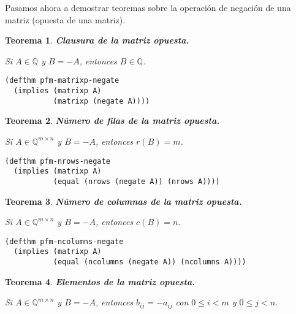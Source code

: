\documentclass[a4paper,10pt]{article}
\newcommand{\Q}[1]{#1 \in \mathbb{Q}}
\newcommand{\M}[3]{#1 \in \mathbb{Q}^{#2 \times #3}}
\newtheorem{teor}{{Teorema}}
\begin{document}
Pasamos ahora a demostrar teoremas sobre la operación de negación de una matriz (opuesta de una matriz).

\par \vspace{16pt}

\begin{teor} \textbf{Clausura de la matriz opuesta.}\vspace{8pt}\par
Si $\Q{A}$ y $B=-A$, entonces $\Q{B}$.
\end{teor}

\begin{lstlisting}[language=clips]
(defthm pfm-matrixp-negate
  (implies (matrixp A)
           (matrixp (negate A))))
\end{lstlisting}

\par \vspace{16pt}

\begin{teor} \textbf{Número de filas de la matriz opuesta.}\vspace{8pt}\par
Si $\M{A}{m}{n}$ y $B=-A$, entonces $r(B) = m$.
\end{teor}

\begin{lstlisting}[language=clips]
(defthm pfm-nrows-negate
  (implies (matrixp A)
           (equal (nrows (negate A)) (nrows A))))
\end{lstlisting}

\par \vspace{16pt}

\begin{teor} \textbf{Número de columnas de la matriz opuesta.}\vspace{8pt}\par
Si $\M{A}{m}{n}$ y $B=-A$, entonces $c(B) = n$.
\end{teor}

\begin{lstlisting}[language=clips]
(defthm pfm-ncolumns-negate
  (implies (matrixp A)
           (equal (ncolumns (negate A)) (ncolumns A))))
\end{lstlisting}

\par \vspace{16pt}

\begin{teor} \textbf{Elementos de la matriz opuesta.}\vspace{8pt}\par
Si $\M{A}{m}{n}$ y $B=-A$, entonces $b_{ij} = -a_{ij}$ con $0 \leq i < m$ y $0 \leq j < n$.
\end{teor}
\end{document}

